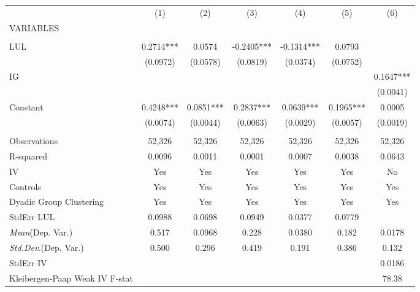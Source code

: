 \documentclass[]{article}
\begin{document}
\begin{tabular}{lcccccc} \hline
 & (1) & (2) & (3) & (4) & (5) & (6) \\
VARIABLES &  &  &  &  &  &  \\ \hline
 &  &  &  &  &  &  \\
LUL & 0.2714*** & 0.0574 & -0.2405*** & -0.1314*** & 0.0793 &  \\
 & (0.0972) & (0.0578) & (0.0819) & (0.0374) & (0.0752) &  \\
IG &  &  &  &  &  & 0.1647*** \\
 &  &  &  &  &  & (0.0041) \\
Constant & 0.4248*** & 0.0851*** & 0.2837*** & 0.0639*** & 0.1965*** & 0.0005 \\
 & (0.0074) & (0.0044) & (0.0063) & (0.0029) & (0.0057) & (0.0019) \\
 &  &  &  &  &  &  \\
Observations & 52,326 & 52,326 & 52,326 & 52,326 & 52,326 & 52,326 \\
R-squared & 0.0096 & 0.0011 & 0.0001 & 0.0007 & 0.0038 & 0.0643 \\
IV & Yes & Yes & Yes & Yes & Yes & No \\
Controls & Yes & Yes & Yes & Yes & Yes & Yes \\
Dyadic Group Clustering & Yes & Yes & Yes & Yes & Yes & Yes \\
StdErr LUL & 0.0988 & 0.0698 & 0.0949 & 0.0377 & 0.0779 &  \\
\textit{Mean}(Dep. Var.) & 0.517 & 0.0968 & 0.228 & 0.0380 & 0.182 & 0.0178 \\
\textit{Std.Dev.}(Dep. Var.) & 0.500 & 0.296 & 0.419 & 0.191 & 0.386 & 0.132 \\
StdErr IV &  &  &  &  &  & 0.0186 \\
 Kleibergen-Paap Weak IV F-stat &  &  &  &  &  & 78.38 \\ \hline
\end{tabular}
\end{document}
